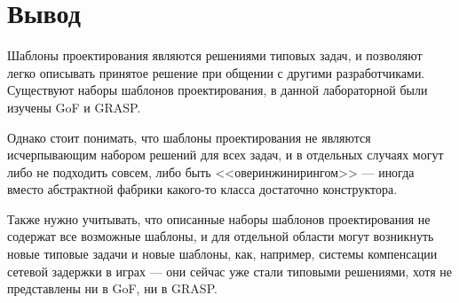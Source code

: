 \section*{Вывод}
Шаблоны проектирования являются решениями типовых задач,
и позволяют легко описывать принятое решение при общении с другими разработчиками.
Существуют наборы шаблонов проектирования, в данной лабораторной были изучены GoF и GRASP\@.

Однако стоит понимать, что шаблоны проектирования не являются исчерпывающим набором
решений для всех задач, и в отдельных случаях могут либо не подходить совсем,
либо быть <<оверинжинирингом>> --- иногда вместо абстрактной фабрики какого-то класса
достаточно конструктора.

Также нужно учитывать, что описанные наборы шаблонов проектирования не содержат все возможные шаблоны,
и для отдельной области могут возникнуть новые типовые задачи и новые шаблоны, как, например,
системы компенсации сетевой задержки в играх --- они сейчас уже стали типовыми решениями,
хотя не представлены ни в GoF, ни в GRASP\@.
